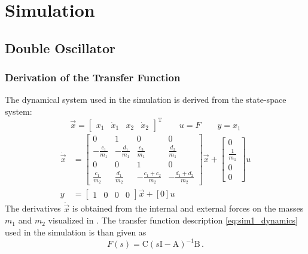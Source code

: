 \chapter{Simulation}
\section{Double Oscillator}\label{sec:app_sim1}
\graphicspath{{./Bilder/simulation_linear}} 

\subsection{Derivation of the Transfer Function}\label{sec:derivation_double_osci}
The dynamical system used in the simulation  is derived from the state-space system:
\begin{equation}
	\vec{x} = 
		\begin{bmatrix}
			x_1 & \dot{x}_1 & x_2 & \dot{x}_2		
		\end{bmatrix}^\mathrm{T}
		\qquad u = F \qquad y = x_1
\end{equation}
\begin{align}
	\dot{\vec{x}} &= 
		\begin{bmatrix}
			0 			& 1 		& 0 			& 0			\\
			-\frac{c_1}{m_1}	& -\frac{d_1}{m_1}  & \frac{c_2}{m_1} 		& \frac{d_2}{m_1}	\\
			0			& 0			& 1				& 0			\\
			\frac{c_1}{m_2}		& \frac{d_1}{m_2}  	& -\frac{c_1+c_2}{m_2} & -\frac{d_1+d_2}{m_2}
		\end{bmatrix} \vec{x} + 
		\begin{bmatrix}
			0 \\ \frac{1}{m_1} \\ 0 \\ 0		
		\end{bmatrix} u 	\\		
	y &= 
		\begin{bmatrix}
			1 & 0 & 0 & 0		
		\end{bmatrix} \vec{x} + [0] u	
\end{align}
The derivatives $\dot{\vec{x}}$ is obtained from the internal and external forces on the masses $m_1$ and $m_2$ visualized in . The transfer function description \eqref{eq:sim1_dynamics} used in the simulation is than given as
\begin{equation}
	F(s) = \mathrm{C}\left(s\mathrm{I}-\mathrm{A}\right)^{-1}\mathrm{B}\,.
\end{equation}

